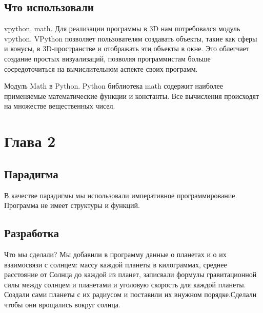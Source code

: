 \documentclass[12pt,a4paper]{extarticle}
\begin{document}
\subsection{Что использовали}
 vpython, math. Для реализации программы в 3D нам потребовался модуль vpython. VPython позволяет пользователям создавать объекты, такие как сферы и конусы, в 3D-пространстве и отображать эти объекты в окне. Это облегчает создание простых визуализаций, позволяя программистам больше сосредоточиться на вычислительном аспекте своих программ.

Модуль Math в Python.
Python библиотека math содержит наиболее применяемые математические функции и константы. Все вычисления происходят на множестве вещественных чисел. 


\section{Глава 2}
\subsection{Парадигма}
В качестве парадигмы мы использовали императивное программирование. Программа не имеет структуры и функций.
\subsection{Разработка}
Что мы сделали? Мы добавили в программу данные о планетах и о их взаимосвязи с солнцем: массу каждой планеты в килограммах, среднее расстояние от Солнца до каждой из планет, записвали формулы гравитационной силы между солнцем и планетами и уголовую скорость для каждой планеты. Создали сами планеты с их радиусом и поставили их внужном порядке.Сделали чтобы они врощались вокруг солнца.
\label{sec:longtermgoals}
\end{document}
